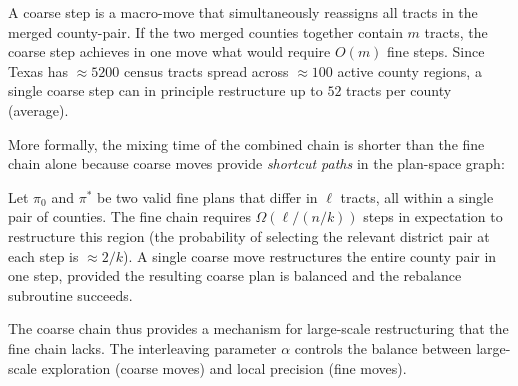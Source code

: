 A coarse \recom{} step is a macro-move that simultaneously reassigns all
tracts in the merged county-pair.
If the two merged counties together contain $m$ tracts, the coarse step
achieves in one move what would require $O(m)$ fine steps.
Since Texas has $\approx 5200$ census tracts spread across $\approx 100$
active county regions, a single coarse step can in principle restructure up
to $52$ tracts per county (average).

More formally, the mixing time of the combined chain is shorter than the
fine chain alone because coarse moves provide \emph{shortcut paths} in
the plan-space graph:

\begin{proposition}
\label{prop:shortcut}
Let $\pi_0$ and $\pi^*$ be two valid fine plans that differ in $\ell$ tracts,
all within a single pair of counties.
The fine \recom{} chain requires $\Omega(\ell / (n/k))$ steps in expectation
to restructure this region (the probability of selecting the relevant
district pair at each step is $\approx 2 / k$).
A single coarse move restructures the entire county pair in one step,
provided the resulting coarse plan is balanced and the rebalance subroutine
succeeds.
\end{proposition}

The coarse chain thus provides a mechanism for large-scale restructuring
that the fine chain lacks.
The interleaving parameter $\alpha$ controls the balance between
large-scale exploration (coarse moves) and local precision (fine moves).
